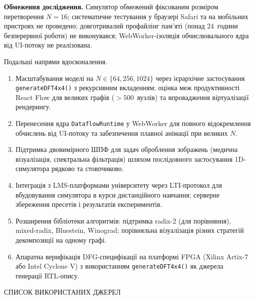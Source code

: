 \documentclass[
]{article}
\begin{document}
\textbf{Обмеження дослідження.} Симулятор обмежений фіксованим розміром
перетворення \(N = 16\); систематичне тестування у браузері Safari та на
мобільних пристроях не проведено; довготривалий профайлінг пам'яті
(понад 24~години безперервної роботи) не виконувався; WebWorker-ізоляція
обчислювального ядра від UI-потоку не реалізована.

Подальші напрями вдосконалення.

\begin{enumerate}
\def\labelenumi{\arabic{enumi}.}
\item
  Масштабування моделі на \(N \in \{ 64,256,1024\}\) через ієрархічне
  застосування \texttt{generateDFT4x4()} з рекурсивним вкладенням;
  оцінка меж продуктивності React Flow для великих графів
  (\(> 500\)~вузлів) та впровадження віртуалізації рендерингу.
\item
  Перенесення ядра \texttt{DataflowRuntime} у WebWorker для повного
  відокремлення обчислень від UI-потоку та забезпечення плавної анімації
  при великих \(N\).
\item
  Підтримка двовимірного ШПФ для задач оброблення зображень (медична
  візуалізація, спектральна фільтрація) шляхом послідовного застосування
  1D-симулятора рядково та стовпчиково.
\item
  Інтеграція з LMS-платформами університету через LTI-протокол для
  вбудовування симулятора в курси дистанційного навчання; серверне
  збереження пресетів і результатів експериментів.
\item
  Розширення бібліотеки алгоритмів: підтримка radix-2 (для порівняння),
  mixed-radix, Bluestein, Winograd; порівняльна візуалізація різних
  стратегій декомпозиції на одному графі.
\item
  Апаратна верифікація DFG-специфікації на платформі FPGA (Xilinx
  Artix-7 або Intel Cyclone V) з використанням \texttt{generateDFT4x4()}
  як джерела генерації RTL-опису.
\end{enumerate}

\protect{}\label{_Toc228305380}{}СПИСОК ВИКОРИСТАНИХ ДЖЕРЕЛ
\end{document}
